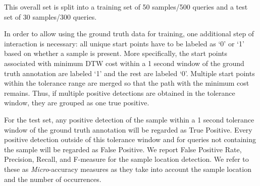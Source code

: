 \documentclass{article}
\begin{document}
This overall set is split into a training set of 50 samples/500 queries and a test set of 30 samples/300 queries.

In order to allow using the ground truth data for training, one additional step of interaction is necessary: all unique start points have to be labeled as `0' or `1' based on whether a sample is present. %
More specifically, the start points associated with minimum DTW cost within a 1 second window of the ground truth annotation are labeled `1' and the rest are labeled `0'. Multiple start points within the tolerance range are merged so that the path with the minimum cost remains. Thus, if multiple positive detections are obtained in the tolerance window, they are grouped as one true positive. %

For the test set, any positive detection of the sample within a 1 second tolerance window of the ground truth annotation will be regarded as True Positive. Every positive detection outside of this tolerance window and for queries not containing the sample will be regarded as False Positive.
We report False Positive Rate, Precision, Recall, and F-measure for the sample location detection. We refer to these as \textit{Micro}-accuracy measures as they take into account the sample location and the number of occurrences.
\end{document}
